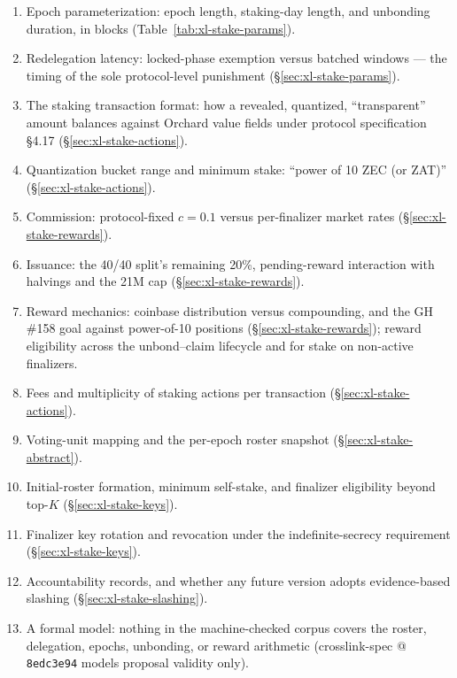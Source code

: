 \documentclass[11pt,a4paper]{article}
\theoremstyle{definition}
\begin{document}
\begin{enumerate}
\item Epoch parameterization: epoch length, staking-day length, and
  unbonding duration, in blocks
  (Table~\ref{tab:xl-stake-params}).
\item Redelegation latency: locked-phase exemption versus batched
  windows --- the timing of the sole protocol-level punishment
  (\S\ref{sec:xl-stake-params}).
\item The staking transaction format: how a revealed, quantized,
  ``transparent'' amount balances against Orchard value fields under
  protocol specification \S4.17 (\S\ref{sec:xl-stake-actions}).
\item Quantization bucket range and minimum stake: ``power of 10 ZEC
  (or ZAT)'' (\S\ref{sec:xl-stake-actions}).
\item Commission: protocol-fixed $c = 0.1$ versus per-finalizer market
  rates (\S\ref{sec:xl-stake-rewards}).
\item Issuance: the 40/40 split's remaining 20\%, pending-reward
  interaction with halvings and the 21M cap
  (\S\ref{sec:xl-stake-rewards}).
\item Reward mechanics: coinbase distribution versus compounding, and
  the GH \#158 goal against power-of-10 positions
  (\S\ref{sec:xl-stake-rewards}); reward eligibility across the
  unbond--claim lifecycle and for stake on non-active finalizers.
\item Fees and multiplicity of staking actions per transaction
  (\S\ref{sec:xl-stake-actions}).
\item Voting-unit mapping and the per-epoch roster snapshot
  (\S\ref{sec:xl-stake-abstract}).
\item Initial-roster formation, minimum self-stake, and finalizer
  eligibility beyond top-$K$ (\S\ref{sec:xl-stake-keys}).
\item Finalizer key rotation and revocation under the
  indefinite-secrecy requirement (\S\ref{sec:xl-stake-keys}).
\item Accountability records, and whether any future version adopts
  evidence-based slashing (\S\ref{sec:xl-stake-slashing}).
\item A formal model: nothing in the machine-checked corpus covers the
  roster, delegation, epochs, unbonding, or reward arithmetic
  (crosslink-spec @ \texttt{8edc3e94} models proposal validity only).
\end{enumerate}

\end{document}
